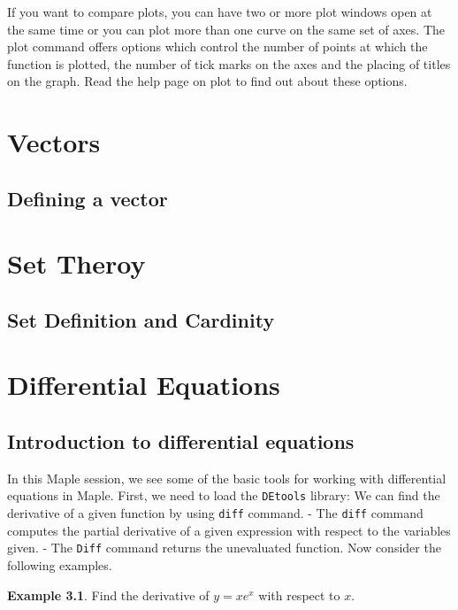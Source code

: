 \documentclass[
]{book}
\theoremstyle{definition}
\theoremstyle{definition}
\newtheorem{example}{Example}[chapter]
\theoremstyle{definition}
\theoremstyle{definition}
\theoremstyle{remark}
\begin{document}
If you want to compare plots, you can have two or more plot windows open at the same time or you can plot more than one curve on the same set of axes. The plot command offers options which control the number of points at which the function is plotted, the number of
tick marks on the axes and the placing of titles on the graph. Read the help page on plot to find out about these options.

\chapter{Vectors}\label{vectors}

\section{Defining a vector}\label{defining-a-vector}

\chapter{Set Theroy}\label{set-theroy}

\section{Set Definition and Cardinity}\label{set-definition-and-cardinity}

\chapter{Differential Equations}\label{differential-equations}

\section{Introduction to differential equations}\label{introduction-to-differential-equations}

In this Maple session, we see some of the basic tools for working with differential equations in Maple.
First, we need to load the \texttt{DEtools} library:
We can find the derivative of a given function by using \texttt{diff} command.
- The \texttt{diff} command computes the partial derivative of a given expression with respect to the variables given.
- The \texttt{Diff} command returns the unevaluated function. Now consider the following examples.

\begin{example}
\protect\hypertarget{exm:unnamed-chunk-24}{}\label{exm:unnamed-chunk-24}Find the derivative of \(y=xe^x\) with respect to \(x\).
\end{example}
\end{document}
